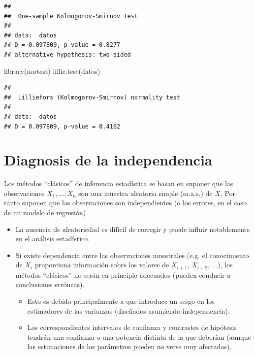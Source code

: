 \documentclass[
]{book}
\newenvironment{Shaded}{\begin{snugshade}}{\end{snugshade}}
\newcommand{\FunctionTok}[1]{\textcolor[rgb]{0.00,0.00,0.00}{#1}}
\newcommand{\NormalTok}[1]{#1}
\theoremstyle{break}
\theoremstyle{nonumberplain}
\begin{document}
\begin{verbatim}
## 
##  One-sample Kolmogorov-Smirnov test
## 
## data:  datos
## D = 0.097809, p-value = 0.8277
## alternative hypothesis: two-sided
\end{verbatim}

\begin{Shaded}
\begin{Highlighting}[]
\FunctionTok{library}\NormalTok{(nortest)}
\FunctionTok{lillie.test}\NormalTok{(datos)}
\end{Highlighting}
\end{Shaded}

\begin{verbatim}
## 
##  Lilliefors (Kolmogorov-Smirnov) normality test
## 
## data:  datos
## D = 0.097809, p-value = 0.4162
\end{verbatim}

\hypertarget{diag-aleat}{%
\section{Diagnosis de la independencia}\label{diag-aleat}}

Los métodos ``clásicos'' de inferencia estadística se basan en
suponer que las observaciones \(X_{1},\ldots,X_{n}\) son una muestra
aleatoria simple (m.a.s.) de \(X\). Por tanto suponen que
las observaciones son independientes (o los errores, en el caso de un
modelo de regresión).

\begin{itemize}
\item
  La ausencia de aleatoriedad es difícil de corregir y puede influir
  notablemente en el análisis estadístico.
\item
  Si existe dependencia entre las observaciones muestrales (e.g.
  el conocimiento de \(X_{i}\) proporciona información sobre los valores
  de \(X_{i+1}\), \(X_{i+2}\), \(\ldots\)), los métodos ``clásicos'' no serán
  en principio adecuados (pueden conducir a conclusiones erróneas).

  \begin{itemize}
  \item
    Esto es debido principalmente a que introduce un sesgo en los
    estimadores de las varianzas (diseñados asumiendo independencia).
  \item
    Los correspondientes intervalos de confianza y
    contrastes de hipótesis tendrán una confianza o una potencia
    distinta de la que deberían (aunque las estimaciones de los parámetros
    pueden no verse muy afectadas).
  \end{itemize}
\end{itemize}
\end{document}
